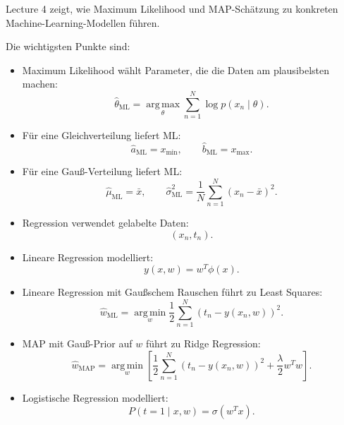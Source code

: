 \documentclass[11pt,a4paper]{scrartcl}
\begin{document}
\begin{answerbox}
    Lecture 4 zeigt, wie Maximum Likelihood und MAP-Schätzung zu konkreten
    Machine-Learning-Modellen führen.

    Die wichtigsten Punkte sind:

    \begin{itemize}
        \item Maximum Likelihood wählt Parameter, die die Daten am plausibelsten
        machen:
        \[
            \hat\theta_{\mathrm{ML}}
            =
            \operatorname*{arg\,max}_{\theta}
            \sum_{n=1}^{N}
            \log p(x_n \mid \theta).
        \]

        \item Für eine Gleichverteilung liefert ML:
        \[
            \hat a_{\mathrm{ML}}=x_{\min},
            \qquad
            \hat b_{\mathrm{ML}}=x_{\max}.
        \]

        \item Für eine Gauß-Verteilung liefert ML:
        \[
            \hat\mu_{\mathrm{ML}}=\bar x,
            \qquad
            \hat\sigma^2_{\mathrm{ML}}
            =
            \frac{1}{N}
            \sum_{n=1}^{N}(x_n-\bar x)^2.
        \]

        \item Regression verwendet gelabelte Daten:
        \[
            (x_n,t_n).
        \]

        \item Lineare Regression modelliert:
        \[
            y(x,w)=w^T\phi(x).
        \]

        \item Lineare Regression mit Gaußschem Rauschen führt zu Least Squares:
        \[
            \hat w_{\mathrm{ML}}
            =
            \operatorname*{arg\,min}_{w}
            \frac{1}{2}
            \sum_{n=1}^{N}
            (t_n-y(x_n,w))^2.
        \]

        \item MAP mit Gauß-Prior auf \(w\) führt zu Ridge Regression:
        \[
            \hat w_{\mathrm{MAP}}
            =
            \operatorname*{arg\,min}_{w}
            \left[
                \frac{1}{2}
                \sum_{n=1}^{N}
                (t_n-y(x_n,w))^2
                +
                \frac{\lambda}{2}w^Tw
            \right].
        \]

        \item Logistische Regression modelliert:
        \[
            P(t=1 \mid x,w)
            =
            \sigma(w^Tx).
        \]


\end{itemize}
\end{answerbox}
\end{document}
